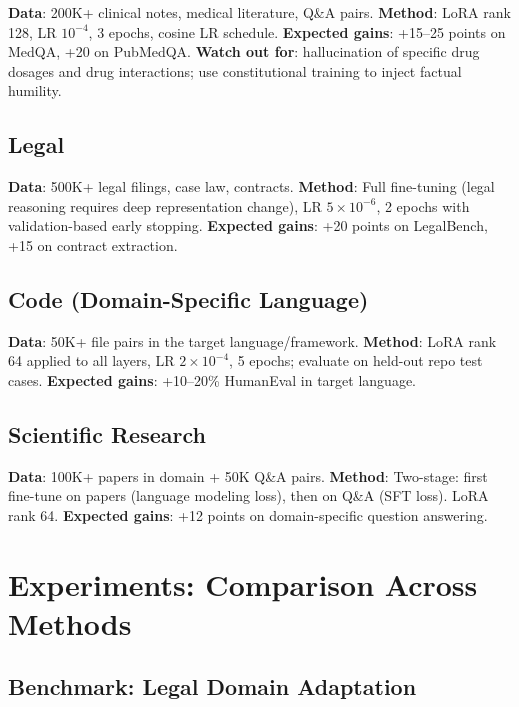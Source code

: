 \documentclass[11pt,a4paper]{article}
\begin{document}
\textbf{Data}: 200K+ clinical notes, medical literature, Q\&A pairs.
\textbf{Method}: LoRA rank 128, LR $10^{-4}$, 3 epochs, cosine LR schedule.
\textbf{Expected gains}: +15--25 points on MedQA, +20 on PubMedQA.
\textbf{Watch out for}: hallucination of specific drug dosages and drug interactions;
use constitutional training to inject factual humility.

\subsection{Legal}

\textbf{Data}: 500K+ legal filings, case law, contracts.
\textbf{Method}: Full fine-tuning (legal reasoning requires deep representation change),
LR $5\times10^{-6}$, 2 epochs with validation-based early stopping.
\textbf{Expected gains}: +20 points on LegalBench, +15 on contract extraction.

\subsection{Code (Domain-Specific Language)}

\textbf{Data}: 50K+ file pairs in the target language/framework.
\textbf{Method}: LoRA rank 64 applied to all layers, LR $2\times10^{-4}$,
5 epochs; evaluate on held-out repo test cases.
\textbf{Expected gains}: +10--20\% HumanEval in target language.

\subsection{Scientific Research}

\textbf{Data}: 100K+ papers in domain + 50K Q\&A pairs.
\textbf{Method}: Two-stage: first fine-tune on papers (language modeling loss),
then on Q\&A (SFT loss). LoRA rank 64.
\textbf{Expected gains}: +12 points on domain-specific question answering.

\section{Experiments: Comparison Across Methods}

\subsection{Benchmark: Legal Domain Adaptation}
\end{document}

